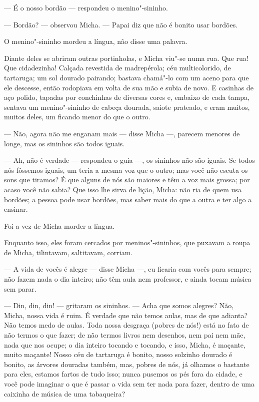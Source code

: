 --- É o nosso bordão --- respondeu o menino"-sininho.

--- Bordão? --- observou Micha. --- Papai diz que não é bonito usar
bordões.

O menino"-sininho mordeu a língua, não disse uma palavra.

Diante deles se abriram outras portinholas, e Micha viu"-se numa rua. Que
rua! Que cidadezinha! Calçada revestida de madrepérola; céu
multicolorido, de tartaruga; um sol dourado pairando; bastava
chamá"-lo com um aceno para que ele descesse, então rodopiava em volta de
sua mão e subia de novo. E casinhas de aço polido, tapadas por
conchinhas de diversas cores e, embaixo de cada tampa, sentava um
menino"-sininho de cabeça dourada, saiote prateado, e eram muitos, muitos
deles, um ficando menor do que o outro.

--- Não, agora não me enganam mais --- disse Micha ---, parecem menores
de longe, mas os sininhos são todos iguais.

--- Ah, não é verdade --- respondeu o guia ---, os sininhos não são
iguais. Se todos nós fôssemos iguais, um teria a mesma voz que o outro;
mas você não escuta os sons que tiramos? É que alguns de nós são maiores
e têm a voz mais grossa; por acaso você não sabia? Que isso lhe sirva de
lição, Micha: não ria de quem usa bordões; a pessoa pode usar bordões,
mas saber mais do que a outra e ter algo a ensinar.

Foi a vez de Micha morder a língua.

Enquanto isso, eles foram cercados por meninos"-sininhos, que puxavam a
roupa de Micha, tilintavam, saltitavam, corriam.

--- A vida de vocês é alegre --- disse Micha ---, eu ficaria com vocês
para sempre; não fazem nada o dia inteiro; não têm aula nem professor, e
ainda tocam música sem parar.

--- Din, din, din! --- gritaram os sininhos. --- Acha que somos alegres?
Não, Micha, nossa vida é ruim. É verdade que não temos aulas, mas de que
adianta? Não temos medo de aulas. Toda nossa desgraça (pobres de nós!)
está no fato de não termos o que fazer; de não termos livros nem
desenhos, nem pai nem mãe, nada que nos ocupe; o dia inteiro tocando e
tocando, e isso, Micha, é maçante, muito maçante! Nosso céu de tartaruga
é bonito, nosso solzinho dourado é bonito, as árvores douradas também,
mas, pobres de nós, já olhamos o bastante para eles, estamos fartos de
tudo isso; nunca pusemos os pés fora da cidade, e você pode imaginar o
que é passar a vida sem ter nada para fazer, dentro de uma caixinha de
música de uma tabaqueira?

